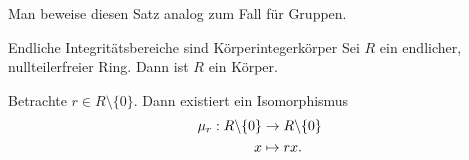 \begin{übung}
Man beweise diesen Satz analog zum Fall für Gruppen.
\end{übung}
\begin{satz}{Endliche Integritätsbereiche sind Körper}{integerkörper}
Sei $R$ ein endlicher, nullteilerfreier Ring. Dann ist $R$ ein Körper.
\end{satz}
\begin{beweis}
Betrachte $r \in R \setminus \{0\}$. Dann existiert ein Isomorphismus
\begin{equation}
\begin{split}
\mu_r: R \backslash \{0\} &\to R \backslash \{0\} \\
x &\mapsto rx.
\end{split}
\end{equation}
\end{beweis}
